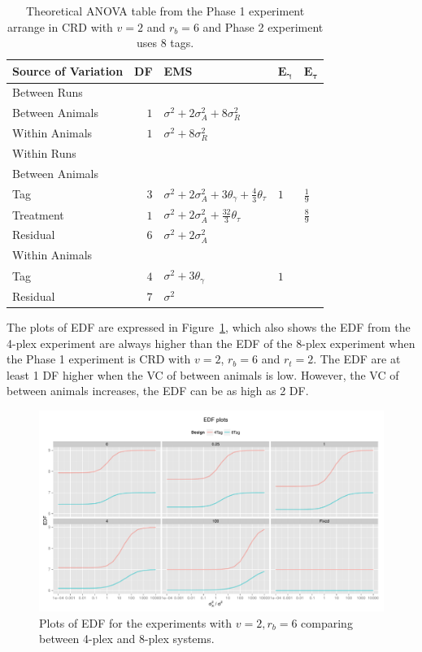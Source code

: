 \documentclass[12pt,a4paper]{article}
\begin{document}
\begin{table}[ht]
\centering
 \caption{Theoretical ANOVA table from the Phase 1 experiment arrange in CRD with $v = 2$ and $r_b = 6$ and Phase 2 experiment uses 8 tags.}
 \begin{tabular}[t]{lrlll} 
 \toprule 
 \multicolumn{1}{l}{\textbf{Source of Variation}} & \multicolumn{1}{l}{\textbf{DF}} & \multicolumn{1}{l}{\textbf{EMS}}& \multicolumn{1}{l}{$\bm{E_{\gamma}}$}&\multicolumn{1}{l}{$\bm{E_{\tau}}$}\\ 
 \midrule 
 Between Runs &  &  & & \\ 
 \quad Between Animals & $1$ & $\sigma^2+2\sigma_{A}^2+8\sigma_{R}^2$ & & \\  \quad Within Animals & $1$ & $\sigma^2+8\sigma_{R}^2$ & & \\ \hline 
 Within Runs &  &  & & \\ 
 \quad Between Animals &  &  & & \\ 
 \quad \quad Tag & $3$ & $\sigma^2+2\sigma_{A}^2+3\theta_{\gamma}+ \frac{4}{3}\theta_{\tau}$ &$1$ & $\frac{1}{9}$\\ 
 \quad \quad Treatment & $1$ & $\sigma^2+2\sigma_{A}^2+\frac{32}{3}\theta_{\tau}$ & & $\frac{8}{9}$\\ 
 \quad \quad Residual & $6$ & $\sigma^2+2\sigma_{A}^2$ & & \\ \hline 
 \quad Within Animals &  &  & & \\ 
 \quad \quad Tag & $4$ & $\sigma^2+3\theta_{\gamma}$ &$1$ & \\ 
 \quad \quad Residual & $7$ & $\sigma^2$ & & \\ 
 \bottomrule 
 \end{tabular} 
 \label{tab:ANOVAPhase1CRD12} 
\end{table} 

The plots of EDF are expressed in Figure~\ref{fig:compare48CRD1}, which also shows the EDF from the 4-plex experiment are always higher than the EDF of the 8-plex experiment when the Phase 1 experiment is CRD with $v = 2$, $r_b = 6$ and $r_t = 2$. The EDF are at least 1 DF higher when the VC of between animals is low. However, the VC of between animals increases, the EDF can be as high as 2 DF. 

\begin{figure}[ht]
\centering
\includegraphics[width=1 \textwidth]{Graph/CRD262Tag4vsTag8.pdf}
\caption{Plots of EDF for the experiments with $v = 2, r_b = 6$ comparing between 4-plex and 8-plex systems.}
\label{fig:compare48CRD1}
\end{figure}
\end{document}
